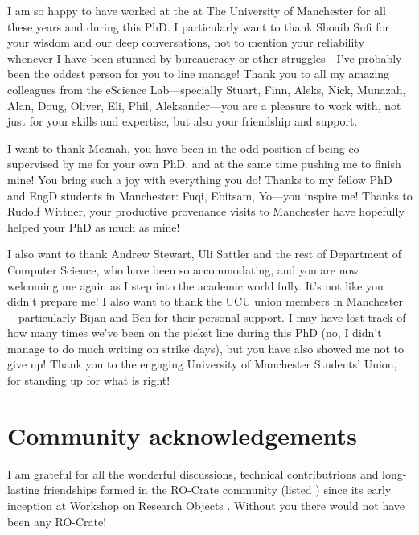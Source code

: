 I am so happy to have worked at the  at The University of Manchester for all these years and during this PhD. I particularly want to thank Shoaib Sufi for your wisdom and our deep conversations, not to mention your reliability whenever I have been stunned by bureaucracy or other struggles---I've probably been the oddest person for you to line manage! 
Thank you to all my amazing colleagues from the eScience Lab---specially Stuart, Finn, Aleks, Nick, Munazah, Alan, Doug, Oliver, Eli, Phil, Aleksander---you are a pleasure to work with, not just for your skills and expertise, but also your friendship and support.

I want to thank Meznah, you have been in the odd position of being co-supervised by me for your own PhD, and at the same time pushing me to finish mine! You bring such a joy with everything you do!  Thanks to my fellow PhD and EngD students in Manchester: Fuqi, Ebitsam, Yo---you inspire me! Thanks to Rudolf Wittner, your productive provenance visits to Manchester have hopefully helped your PhD as much as mine!  

I also want to thank Andrew Stewart, Uli Sattler and the rest of Department of Computer Science, who have been so accommodating, and you are now welcoming me again as I step into the academic world fully. It's not like you didn't prepare me!
I also want to thank the UCU union members in Manchester ---particularly Bijan and Ben for their personal support. I may have lost track of how many times we've been on the picket line during this PhD (no, I didn't manage to do much writing on strike days), but you have also showed me not to give up!  Thank you to the engaging University of Manchester Students' Union, for standing up for what is right!


\section{Community acknowledgements}\label{community-acknowledgements}

I am grateful for all the wonderful discussions, technical contributrions and long-lasting friendships formed in the RO-Crate community (listed ) since its early inception \cite{Ó Carragáin 2019a} at Workshop on Research Objects . Without you there would not have been any RO-Crate!

